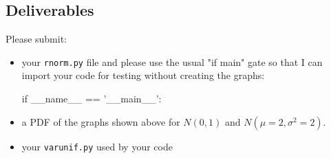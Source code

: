 \begin{fullwidth}
\section{Deliverables}

Please submit:

\begin{itemize}
\item your {\tt rnorm.py} file and please use the usual "if main" gate so that I can import your code for testing without creating the graphs:
\begin{pyverbatim}
if __name__ == '__main__':
\end{pyverbatim}

\item a PDF of the graphs shown above for $N(0,1)$ and $N(\mu=2,\sigma^2=2)$.
\item your {\tt varunif.py} used by your code

\end{itemize}

\end{fullwidth}

